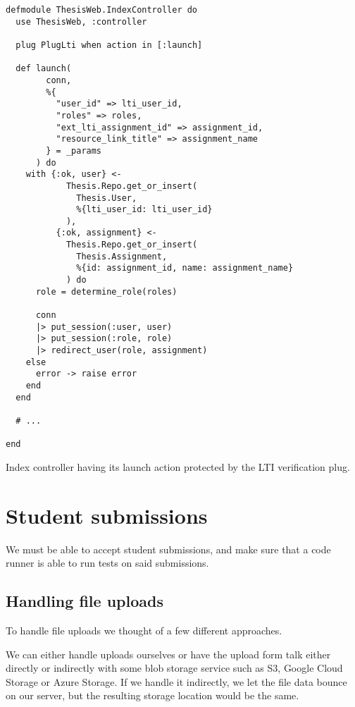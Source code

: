 \label{pluglti_listing}
\begin{listing}
\begin{verbatim}
defmodule ThesisWeb.IndexController do
  use ThesisWeb, :controller

  plug PlugLti when action in [:launch]
  
  def launch(
        conn,
        %{
          "user_id" => lti_user_id,
          "roles" => roles,
          "ext_lti_assignment_id" => assignment_id,
          "resource_link_title" => assignment_name
        } = _params
      ) do
    with {:ok, user} <-
            Thesis.Repo.get_or_insert(
              Thesis.User,
              %{lti_user_id: lti_user_id}
            ),
          {:ok, assignment} <-
            Thesis.Repo.get_or_insert(
              Thesis.Assignment,
              %{id: assignment_id, name: assignment_name}
            ) do
      role = determine_role(roles)
  
      conn
      |> put_session(:user, user)
      |> put_session(:role, role)
      |> redirect_user(role, assignment)
    else
      error -> raise error
    end
  end
  
  # ...
  
end
\end{verbatim}
\caption{Index controller having its launch action protected by the LTI verification plug.}
\end{listing}


\section{Student submissions}

We must be able to accept student submissions, and make sure that a code runner is able to run tests on said submissions.

\subsection{Handling file uploads}

To handle file uploads we thought of a few different approaches.

We can either handle uploads ourselves or have the upload form talk either directly or indirectly with some blob storage service such as S3, Google Cloud Storage or Azure Storage. If we handle it indirectly, we let the file data bounce on our server, but the resulting storage location would be the same.

